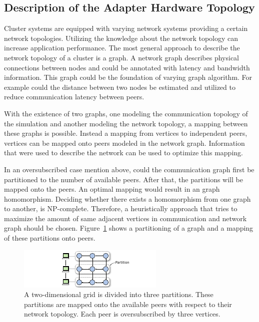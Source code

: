 \subsection*{Description of the Adapter Hardware Topology}

Cluster systems are equipped with varying network systems providing a
certain network topologies.  Utilizing the knowledge about the network
topology can increase application performance.  The most general
approach to describe the network topology of a cluster is a graph. A
network graph describes physical connections between nodes and could
be annotated with latency and bandwidth information.  This graph could
be the foundation of varying graph algorithm. For example could the
distance between two nodes be estimated and utilized to reduce
communication latency between peers.

With the existence of two graphs, one modeling the communication
topology of the simulation and another modeling the network
topology, a mapping between these graphs is possible.  Instead a
mapping from vertices to independent peers, vertices can be mapped
onto peers modeled in the network graph. Information that were used
to describe the network can be used to optimize this mapping.

In an oversubscribed case mention above, could the communication graph first be
partitioned to the number of available peers. After that, the
partitions will be mapped onto the peers.  An optimal mapping would
result in an graph homomorphism. Deciding whether there exists a
homomorphism from one graph to another, is NP-complete. Therefore, a
heuristically approach that tries to maximize the amount of same
adjacent vertices in communication and network graph should be
chosen. Figure~\ref{fig:graph_partitioning} shows a partitioning
of a graph and a mapping of these partitions onto peers.

\begin{figure}[H]
  \centering \includegraphics[width=\textwidth]{graphics/60_graph_partitioning}
  \caption{A two-dimensional grid is divided into three partitions.
    These partitions are mapped onto the available peers with respect
    to their network topology. Each peer is oversubscribed by three
    vertices.}
  \label{fig:graph_partitioning}
\end{figure}

